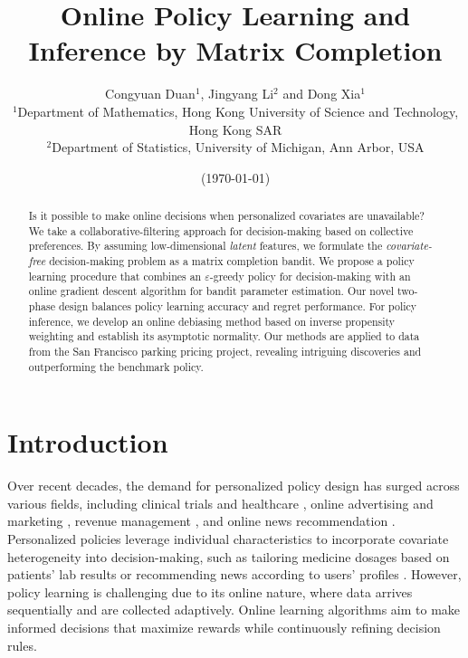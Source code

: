 \documentclass[12pt]{article}
\title{Online Policy Learning and Inference by Matrix Completion}
\author{Congyuan Duan$^1$, Jingyang Li$^2$ and Dong Xia$^1$\\
  $^1${\small Department of Mathematics, Hong Kong University of Science and Technology, Hong Kong SAR}\\
  $^2${\small Department of Statistics, University of Michigan, Ann Arbor, USA} }
\date{(\today)}
\theoremstyle{plain}
\begin{document}
\maketitle



\begin{abstract}
Is it possible to make online decisions when personalized covariates are unavailable? We take a collaborative-filtering approach for decision-making based on collective preferences. By assuming low-dimensional  \emph{latent} features, we formulate the \emph{covariate-free} decision-making problem as a matrix completion bandit. 
We propose a policy learning procedure that combines an $\varepsilon$-greedy policy for decision-making with an online gradient descent algorithm for bandit parameter estimation. Our novel two-phase design balances policy learning accuracy and regret performance. For policy inference, we develop an online debiasing method based on inverse propensity weighting and establish its asymptotic normality. Our methods are applied to data from the San Francisco parking pricing project, revealing intriguing discoveries and outperforming the benchmark policy.
\end{abstract}


\section{Introduction}\label{sec:intro}

Over recent decades, the demand for personalized policy design has surged across various fields, including clinical trials and healthcare \citep{murphy2003optimal, kim2011battle, bertsimas2017personalized}, online advertising and marketing \citep{bottou2013counterfactual, he2012timing, bertsimas2020predictive}, revenue management \citep{chen2022statistical}, and online news recommendation \citep{li2010contextual, ban2019big}. Personalized policies leverage individual characteristics to incorporate covariate heterogeneity into decision-making, such as tailoring medicine dosages based on patients' lab results \citep{murphy2003optimal} or recommending news according to users' profiles \citep{li2010contextual}. However, policy learning is challenging due to its online nature, where data arrives sequentially and are collected adaptively. Online learning algorithms aim to make informed decisions that maximize rewards while continuously refining decision rules. 
\end{document}
